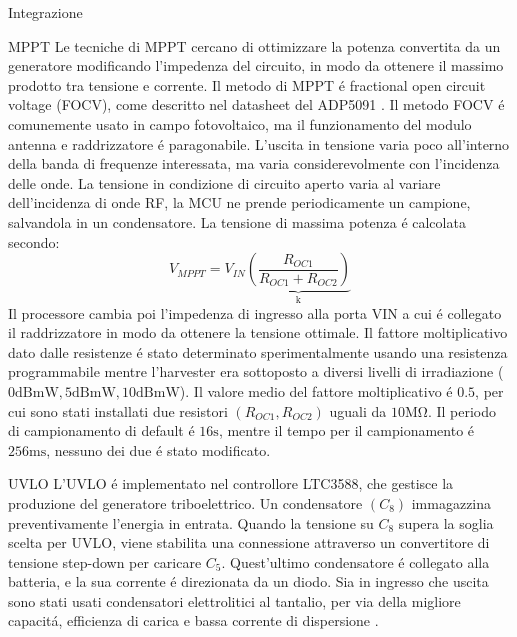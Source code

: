 \begin{section}{Integrazione}
    \begin{subsection}{MPPT}
        Le tecniche di MPPT cercano di ottimizzare la potenza convertita da un generatore modificando l'impedenza del circuito, in modo da ottenere il massimo prodotto tra tensione e corrente. Il metodo di MPPT \'e fractional open circuit voltage (FOCV), come descritto nel datasheet del ADP5091 \cite{ADP5091DatasheetProduct}. Il metodo FOCV \'e comunemente usato in campo fotovoltaico, ma il funzionamento del modulo antenna e raddrizzatore \'e paragonabile. L'uscita in tensione varia poco all'interno della banda di frequenze interessata, ma varia considerevolmente con l'incidenza delle onde. La tensione in condizione di circuito aperto varia al variare dell'incidenza di onde RF, la MCU ne prende periodicamente un campione, salvandola in un condensatore. La tensione di massima potenza \'e calcolata secondo:
        \begin{equation*}
            V_{MPPT} = V_{IN}\underbrace{\left(\frac{R_{OC1}}{R_{OC1}+R_{OC2}}\right)}_\mathrm{k}
         \end{equation*}
        Il processore cambia poi l'impedenza di ingresso alla porta VIN a cui \'e collegato il raddrizzatore in modo da ottenere la tensione ottimale. Il fattore moltiplicativo dato dalle resistenze \'e stato determinato sperimentalmente usando una resistenza programmabile mentre l'harvester era sottoposto a diversi livelli di irradiazione (\(0\mathrm{dBmW},5\mathrm{dBmW},10\mathrm{dBmW}\)). Il valore medio del fattore moltiplicativo \'e \(0.5\), per cui sono stati installati due resistori \((R_{OC1},R_{OC2})\) uguali da \(10\mathrm{M\Omega}\). Il periodo di campionamento di default \'e \(16\mathrm{s}\), mentre il tempo per il campionamento \'e \(256\mathrm{ms}\), nessuno dei due \'e stato modificato.
    \end{subsection}

    \begin{subsection}{UVLO}
        L'UVLO \'e implementato nel controllore LTC3588, che gestisce la produzione del generatore triboelettrico. Un condensatore \((C_8)\) immagazzina preventivamente l'energia in entrata. Quando la tensione su  \(C_8\) supera la soglia scelta per UVLO, viene stabilita una connessione attraverso un convertitore di tensione step-down per caricare \(C_5\). Quest'ultimo condensatore \'e collegato alla batteria, e la sua corrente \'e direzionata da un diodo. Sia in ingresso che uscita sono stati usati condensatori elettrolitici al tantalio, per via della migliore capacit\'a, efficienza di carica e bassa corrente di dispersione \cite{torkiElectrolyticCapacitorProperties2023}.
    \end{subsection}


\end{section}
